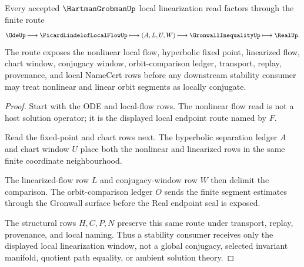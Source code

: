 \begin{theorem}
\label{thm:hartman-grobman-linearization-window}
Every accepted $\HartmanGrobmanUp$ local linearization read factors through the finite route
$$
\OdeUp \longmapsto \PicardLindelofLocalFlowUp \longmapsto (A,L,U,W) \longmapsto \GronwallInequalityUp \longmapsto \RealUp .
$$
The route exposes the nonlinear local flow, hyperbolic fixed point, linearized flow, chart window, conjugacy window, orbit-comparison ledger, transport, replay, provenance, and local NameCert rows before any downstream stability consumer may treat nonlinear and linear orbit segments as locally conjugate.
\end{theorem}
\begin{proof}
Start with the ODE and local-flow rows. The nonlinear flow read is not a host solution operator; it is the displayed local endpoint route named by $F$.

Read the fixed-point and chart rows next. The hyperbolic separation ledger $A$ and chart window $U$ place both the nonlinear and linearized rows in the same finite coordinate neighbourhood.

The linearized-flow row $L$ and conjugacy-window row $W$ then delimit the comparison. The orbit-comparison ledger $O$ sends the finite segment estimates through the Gronwall surface before the Real endpoint seal is exposed.

The structural rows $H,C,P,N$ preserve this same route under transport, replay, provenance, and local naming. Thus a stability consumer receives only the displayed local linearization window, not a global conjugacy, selected invariant manifold, quotient path equality, or ambient solution theory.
\end{proof}

